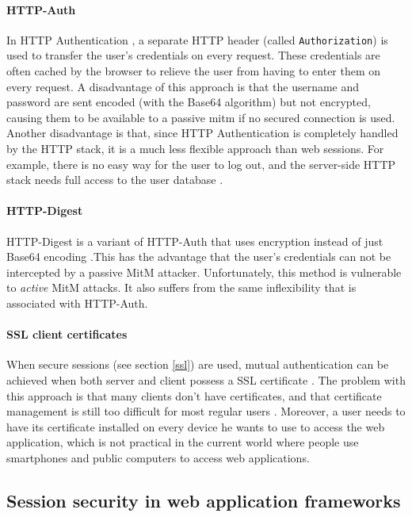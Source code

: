 \paragraph{HTTP-Auth}
In HTTP Authentication \cite{rfc2617}, a separate HTTP header (called \texttt{Authorization}) is used to transfer the user's credentials on every request. These credentials are often cached by the browser to relieve the user from having to enter them on every request. A disadvantage of this approach is that the username and password are sent encoded (with the Base64 algorithm) but not encrypted, causing them to be available to a passive \gls{mitm} if no secured connection is used. Another disadvantage is that, since HTTP Authentication is completely handled by the HTTP stack, it is a much less flexible approach than web sessions. For example, there is no easy way for the user to log out, and the server-side HTTP stack needs full access to the user database \cite{Adida2008}.

\paragraph{HTTP-Digest}
HTTP-Digest is a variant of HTTP-Auth that uses encryption instead of just Base64 encoding \cite{rfc2617}.This has the advantage that the user's credentials can not be intercepted by a passive MitM attacker. Unfortunately, this method is vulnerable to \emph{active} MitM attacks. It also suffers from the same inflexibility that is associated with HTTP-Auth.

\paragraph{SSL client certificates}\label{certificates}
When secure sessions (see section \ref{ssl}) are used, mutual authentication can be achieved when both server and client possess a SSL certificate \cite{Park2000}. The problem with this approach is that many clients don't have certificates, and that certificate management is still too difficult for most regular users \cite{Whitten1999}. Moreover, a user needs to have its certificate installed on every device he wants to use to access the web application, which is not practical in the current world where people use smartphones and public computers to access web applications.

\subsection{Session security in web application frameworks}\label{frameworks}


